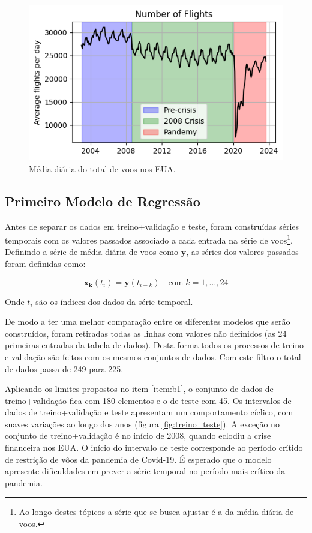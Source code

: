 \documentclass[final,5p]{elsarticle}
\numberwithin{equation}{section}
\begin{document}
    \begin{figure}[hbt!]
        \includegraphics[width=0.95\columnwidth]{A_NewSeries.png}
        \caption{Média diária do total de voos nos EUA.}
        \label{fig:serie_alternativa}
    \end{figure}

    \subsection{Primeiro Modelo de Regressão}

    Antes de separar os dados em treino+validação e teste, foram construídas séries temporais com os valores passados associado a cada entrada na série de voos\footnote{Ao longo destes tópicos a série que se busca ajustar é a da média diária de voos.}. Definindo a série de média diária de voos como $\textbf{y}$, as séries dos valores passados foram definidas como:

    \begin{equation}
        \textbf{x}_{\textbf{k}}(t_i) = \textbf{y}(t_{i-k}) \quad \text{com} \; k=1,\ldots,24 \label{eq:definicao_xs}
    \end{equation}

    \noindent Onde $t_i$ são os índices dos dados da série temporal.

    De modo a ter uma melhor comparação entre os diferentes modelos que serão construídos, foram retiradas todas as linhas com valores não definidos (as 24 primeiras entradas da tabela de dados). Desta forma todos os processos de treino e validação são feitos com os mesmos conjuntos de dados. Com este filtro o total de dados passa de 249 para 225.

    Aplicando os limites propostos no item \ref{item:b1}, o conjunto de dados de treino+validação fica com 180 elementos e o de teste com 45. Os intervalos de dados de treino+validação e teste apresentam um comportamento cíclico, com suaves variações ao longo dos anos (figura \ref{fig:treino_teste}). A exceção no conjunto de treino+validação é no início de 2008, quando eclodiu a crise financeira nos EUA. O início do intervalo de teste corresponde ao período crítido de restrição de vôos da pandemia de Covid-19. É esperado que o modelo apresente dificuldades em prever a série temporal no período mais crítico da pandemia.
\end{document}
